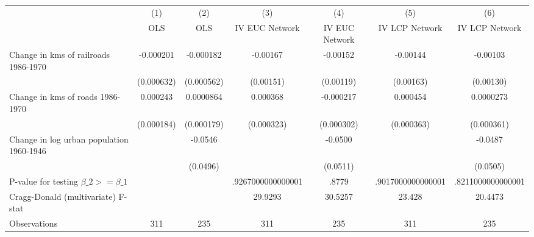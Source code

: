 {
\def\sym#1{\ifmmode^{#1}\else\(^{#1}\)\fi}
\begin{tabular}{l*{6}{c}}
\hline\hline
                &\multicolumn{1}{c}{(1)}&\multicolumn{1}{c}{(2)}&\multicolumn{1}{c}{(3)}&\multicolumn{1}{c}{(4)}&\multicolumn{1}{c}{(5)}&\multicolumn{1}{c}{(6)}\\
                &\multicolumn{1}{c}{OLS}&\multicolumn{1}{c}{OLS}&\multicolumn{1}{c}{IV EUC Network}&\multicolumn{1}{c}{IV EUC Network}&\multicolumn{1}{c}{IV LCP Network}&\multicolumn{1}{c}{IV LCP Network}\\
\hline
Change in kms of railroads 1986-1970&-0.000201         &-0.000182         & -0.00167         & -0.00152         & -0.00144         & -0.00103         \\
                &(0.000632)         &(0.000562)         &(0.00151)         &(0.00119)         &(0.00163)         &(0.00130)         \\
[1em]
Change in kms of roads 1986-1970& 0.000243         &0.0000864         & 0.000368         &-0.000217         & 0.000454         &0.0000273         \\
                &(0.000184)         &(0.000179)         &(0.000323)         &(0.000302)         &(0.000363)         &(0.000361)         \\
[1em]
Change in log urban population 1960-1946&                  &  -0.0546         &                  &  -0.0500         &                  &  -0.0487         \\
                &                  & (0.0496)         &                  & (0.0511)         &                  & (0.0505)         \\
\hline
P-value for testing $\beta\_{2} >= \beta\_{1}$&                  &                  &.9267000000000001         &    .8779         &.9017000000000001         &.8211000000000001         \\
Cragg-Donald (multivariate) F-stat&                  &                  &  29.9293         &  30.5257         &   23.428         &  20.4473         \\
Observations    &      311         &      235         &      311         &      235         &      311         &      235         \\
\hline\hline
\end{tabular}
}
